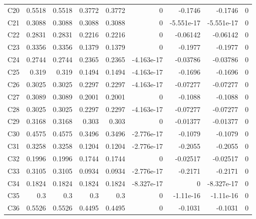 \documentclass[10pt]{article}
\begin{document}
\begin{longtable}{@{}lrrrrrrrr@{}}
C20 & 0.5518 & 0.5518 & 0.3772 & 0.3772 & 0 & -0.1746 & -0.1746 & 0\\[1pt]
C21 & 0.3088 & 0.3088 & 0.3088 & 0.3088 & 0 & -5.551e-17 & -5.551e-17 & 0\\[1pt]
C22 & 0.2831 & 0.2831 & 0.2216 & 0.2216 & 0 & -0.06142 & -0.06142 & 0\\[1pt]
C23 & 0.3356 & 0.3356 & 0.1379 & 0.1379 & 0 & -0.1977 & -0.1977 & 0\\[1pt]
C24 & 0.2744 & 0.2744 & 0.2365 & 0.2365 & -4.163e-17 & -0.03786 & -0.03786 & 0\\[1pt]
C25 & 0.319 & 0.319 & 0.1494 & 0.1494 & -4.163e-17 & -0.1696 & -0.1696 & 0\\[1pt]
C26 & 0.3025 & 0.3025 & 0.2297 & 0.2297 & -4.163e-17 & -0.07277 & -0.07277 & 0\\[1pt]
C27 & 0.3089 & 0.3089 & 0.2001 & 0.2001 & 0 & -0.1088 & -0.1088 & 0\\[1pt]
C28 & 0.3025 & 0.3025 & 0.2297 & 0.2297 & -4.163e-17 & -0.07277 & -0.07277 & 0\\[1pt]
C29 & 0.3168 & 0.3168 & 0.303 & 0.303 & 0 & -0.01377 & -0.01377 & 0\\[1pt]
C30 & 0.4575 & 0.4575 & 0.3496 & 0.3496 & -2.776e-17 & -0.1079 & -0.1079 & 0\\[1pt]
C31 & 0.3258 & 0.3258 & 0.1204 & 0.1204 & -2.776e-17 & -0.2055 & -0.2055 & 0\\[1pt]
C32 & 0.1996 & 0.1996 & 0.1744 & 0.1744 & 0 & -0.02517 & -0.02517 & 0\\[1pt]
C33 & 0.3105 & 0.3105 & 0.0934 & 0.0934 & -2.776e-17 & -0.2171 & -0.2171 & 0\\[1pt]
C34 & 0.1824 & 0.1824 & 0.1824 & 0.1824 & -8.327e-17 & 0 & -8.327e-17 & 0\\[1pt]
C35 & 0.3 & 0.3 & 0.3 & 0.3 & 0 & -1.11e-16 & -1.11e-16 & 0\\[1pt]
C36 & 0.5526 & 0.5526 & 0.4495 & 0.4495 & 0 & -0.1031 & -0.1031 & 0\\[1pt]
\end{longtable}\normalsize
\end{document}
